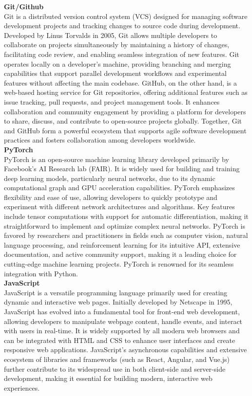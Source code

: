 \textbf{Git/Github}\\
Git is a distributed version control system (VCS) designed for managing software development projects and tracking changes to source code during development. Developed by Linus Torvalds in 2005, Git allows multiple developers to collaborate on projects simultaneously by maintaining a history of changes, facilitating code review, and enabling seamless integration of new features. Git operates locally on a developer's machine, providing branching and merging capabilities that support parallel development workflows and experimental features without affecting the main codebase. GitHub, on the other hand, is a web-based hosting service for Git repositories, offering additional features such as issue tracking, pull requests, and project management tools. It enhances collaboration and community engagement by providing a platform for developers to share, discuss, and contribute to open-source projects globally. Together, Git and GitHub form a powerful ecosystem that supports agile software development practices and fosters collaboration among developers worldwide.\\
\textbf{PyTorch}\\
PyTorch is an open-source machine learning library developed primarily by Facebook's AI Research lab (FAIR). It is widely used for building and training deep learning models, particularly neural networks, due to its dynamic computational graph and GPU acceleration capabilities. PyTorch emphasizes flexibility and ease of use, allowing developers to quickly prototype and experiment with different network architectures and algorithms. Key features include tensor computations with support for automatic differentiation, making it straightforward to implement and optimize complex neural networks. PyTorch is favored by researchers and practitioners in fields such as computer vision, natural language processing, and reinforcement learning for its intuitive API, extensive documentation, and active community support, making it a leading choice for cutting-edge machine learning projects. PyTorch is renowned for its seamless integration with Python.\\
\textbf{JavaScript}\\
JavaScript is a versatile programming language primarily used for creating dynamic and interactive web pages. Initially developed by Netscape in 1995, JavaScript has evolved into a fundamental tool for front-end web development, allowing developers to manipulate webpage content, handle events, and interact with users in real-time. It is widely supported by all modern web browsers and can be integrated with HTML and CSS to enhance user interfaces and create responsive web applications. JavaScript's asynchronous capabilities and extensive ecosystem of libraries and frameworks (such as React, Angular, and Vue.js) further contribute to its widespread use in both client-side and server-side development, making it essential for building modern, interactive web experiences.\\
